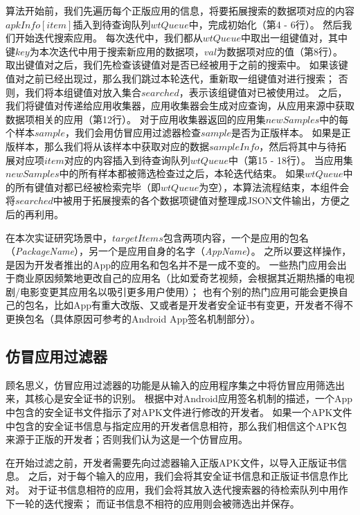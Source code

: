 算法开始前，我们先遍历每个正版应用的信息，将要拓展搜索的数据项对应的内容$apkInfo[item]$插入到待查询队列$wtQueue$中，完成初始化（第4 - 6行）。
然后我们开始迭代搜索应用。
每次迭代中，我们都从$wtQueue$中取出一组键值对，其中键$key$为本次迭代中用于搜索新应用的数据项，$val$为数据项对应的值（第8行）。
取出键值对之后，我们先检查该键值对是否已经被用于之前的搜索中。
如果该键值对之前已经出现过，那么我们跳过本轮迭代，重新取一组键值对进行搜索；
否则，我们将本组键值对放入集合$searched$，表示该组键值对已被使用过。
之后，我们将键值对传递给应用收集器，应用收集器会生成对应查询，从应用来源中获取数据项相关的应用（第12行）。
对于应用收集器返回的应用集$newSamples$中的每个样本$sample$，我们会用仿冒应用过滤器检查$sample$是否为正版样本。
如果是正版样本，那么我们将从该样本中获取对应的数据$sampleInfo$，然后将其中与待拓展对应项$item$对应的内容插入到待查询队列$wtQueue$中（第15 - 18行）。
当应用集$newSamples$中的所有样本都被筛选检查过之后，本轮迭代结束。
如果$wtQueue$中的所有键值对都已经被检索完毕（即$wtQueue$为空），本算法流程结束，本组件会将$searched$中被用于拓展搜索的各个数据项键值对整理成JSON文件输出，方便之后的再利用。

在本次实证研究场景中，$targetItems$包含两项内容，一个是应用的包名（\emph{PackageName}），另一个是应用自身的名字（\emph{AppName}）。
之所以要这样操作，是因为开发者推出的App的应用名和包名并不是一成不变的。
一些热门应用会出于商业原因频繁地更改自己的应用名（比如爱奇艺视频，会根据其近期热播的电视剧/电影变更其应用名以吸引更多用户使用）；
也有个别的热门应用可能会更换自己的包名，比如App有重大改版、又或者是开发者安全证书有变更，开发者不得不更换包名（具体原因可参考的Android App签名机制部分）。

\subsection{仿冒应用过滤器}
顾名思义，仿冒应用过滤器的功能是从输入的应用程序集之中将仿冒应用筛选出来，其核心是安全证书的识别。
根据中对Android应用签名机制的描述，一个App中包含的安全证书文件指示了对APK文件进行修改的开发者。
如果一个APK文件中包含的安全证书信息与指定应用的开发者信息相符，那么我们相信这个APK包来源于正版的开发者；否则我们认为这是一个仿冒应用。

在开始过滤之前，开发者需要先向过滤器输入正版APK文件，以导入正版证书信息。
之后，对于每个输入的应用，我们会将其安全证书信息和正版证书信息作比对。
对于证书信息相符的应用，我们会将其放入迭代搜索器的待检索队列中用作下一轮的迭代搜索；
而证书信息不相符的应用则会被筛选出并保存。


